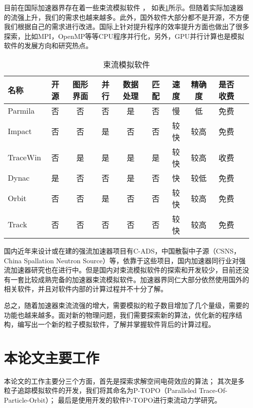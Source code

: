 目前在国际加速器界存在着一些束流模拟软件
\cite{cern_codeList,takeda1998PARMILA,qiang1999impact,uriot2014tracewin,tanke2002dynac,shishlo2006orbit,aseev2005track}，
如表\ref{tab:space_charge_code}所示。但随着实际加速器的流强上升，我们的需求也越来越多。此外，国外软件大部分都不是开源，不方便我们根据自己的需求进行改进。国际上针对提升程序的效率提升方面也做出了很多探索，比如MPI，OpenMP等等CPU程序并行化，另外，GPU并行计算也是模拟软件的发展方向和研究热点。

\begin{table}
  \centering
  \begin{tabular}{|>{\small}l|c|c|c|c|c|c|c|c|c|}
    \hline
    名称	    &开源  &图形界面 &并行	&数据处理     &匹配	&速度 &精确度	 & 是否收费  \\
    \hline
    Parmila  	&否	   &否	     &否	&是	          &否	&慢	  &低	     & 免费	\\
    Impact  	&否	   &否	     &是	&否	          &否	&较快 &较高	     & 免费	\\
    TraceWin  	&否	   &是	     &是	&是	          &是	&较快 &较高	     & 收费	\\
    Dynac  	    &是	   &否	     &否	&是	          &否	&快   &较低	     & 免费	\\
    Orbit  	    &否	   &否	     &是	&否	          &否	&较快 &较高	     & 免费	\\
    Track  	    &否	   &否	     &否	&否	          &否	&较快 &较高	     & 免费	\\
    \hline
  \end{tabular}
  \caption{束流模拟软件}
  \label{tab:space_charge_code}
\end{table}

国内近年来设计或在建的强流加速器项目有C-ADS，中国散裂中子源（CSNS，China Spallation Neutron Source）等，依靠于这些项目，国内加速器同行业对强流加速器研究也在进行中。但是国内对束流模拟软件的探索和开发较少，目前还没有一套比较成熟完备的加速器束流模拟软件。加速器界同仁大部分依然使用国外的相关软件，并且对软件内部的计算过程并不十分了解。

总之，随着加速器束流流强的增大，需要模拟的粒子数目增加了几个量级，需要的功能也越来越多。面对新的物理问题，我们需要探索新的算法，优化新的程序结构，编写出一个新的粒子模拟软件，了解并掌握软件背后的计算过程。

\section{本论文主要工作}
本论文的工作主要分三个方面，首先是探索求解空间电荷效应的算法；
其次是多粒子追踪模拟软件的开发，我们将其命名为P-TOPO（Paralleled Trace-Of-Particle-Orbit）；
最后是使用开发的软件P-TOPO进行束流动力学研究。

